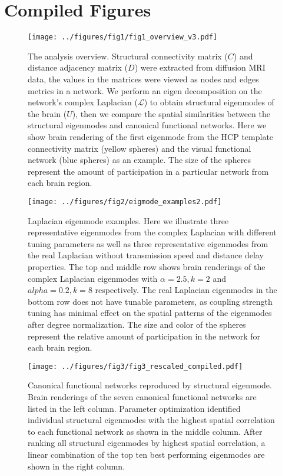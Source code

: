 \documentclass{article}
\begin{document}
\section{Compiled Figures}

\begin{figure}[ht]
  \centering
  \texttt{[image: ../figures/fig1/fig1\_overview\_v3.pdf]}
  \caption{The analysis overview. Structural connectivity matrix ($C$) and distance adjacency matrix ($D$) were extracted from diffusion MRI data, the values in the matrices were viewed as nodes and edges metrics in a network. We perform an eigen decomposition on the network's complex Laplacian ($\mathcal{L}$) to obtain structural eigenmodes of the brain ($U$), then we compare the spatial similarities between the structural eigenmodes and canonical functional networks. Here we show brain rendering of the first eigenmode from the HCP template connectivity matrix (yellow spheres) and the visual functional network (blue spheres) as an example. The size of the spheres represent the amount of participation in a particular network from each brain region.}
  \label{fig:fig1}
\end{figure}

\begin{figure}[ht]
 \centering
 \texttt{[image: ../figures/fig2/eigmode\_examples2.pdf]}
 \caption{Laplacian eigenmode examples. Here we illustrate three representative eigenmodes from the complex Laplacian with different tuning parameters as well as three representative eigenmodes from the real Laplacian without transmission speed and distance delay properties. The top and middle row shows brain renderings of the complex Laplacian eigenmodes with {$\alpha = 2.5, k = 2$} and {$alpha = 0.2, k = 8$} respectively. The real Laplacian eigenmodes in the bottom row does not have tunable parameters, as coupling strength tuning has minimal effect on the spatial patterns of the eigenmodes after degree normalization. The size and color of the spheres represent the relative amount of participation in the network for each brain region.}
 \label{fig:fig2}
\end{figure}

\begin{figure}[ht]
 \centering
 \texttt{[image: ../figures/fig3/fig3\_rescaled\_compiled.pdf]}
 \caption{Canonical functional networks reproduced by structural eigenmode. Brain renderings of the seven canonical functional networks are listed in the left column. Parameter optimization identified individual structural eigenmodes with the highest spatial correlation to each functional network as shown in the middle column. After ranking all structural eigenmodes by highest spatial correlation, a linear combination of the top ten best performing eigenmodes are shown in the right column.}
 \label{fig:fig3}
\end{figure}
\end{document}
